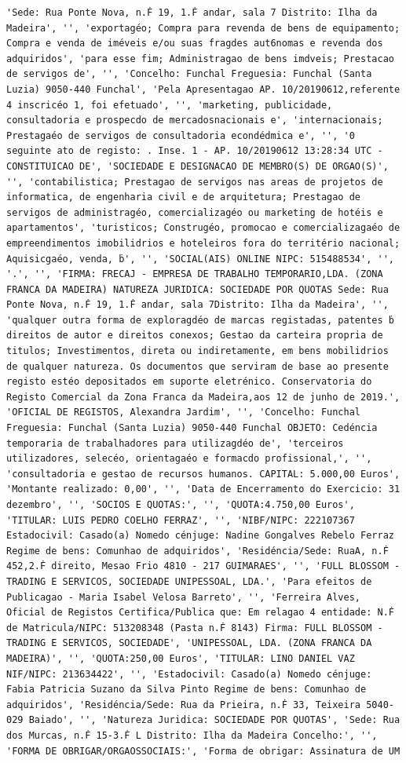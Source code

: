 \documentclass[
  12pt,
]{article}
\begin{document}
\begin{verbatim}
'Sede: Rua Ponte Nova, n.Ḟ 19, 1.Ḟ andar, sala 7 Distrito: Ilha da Madeira', '', 'exportagéo; Compra para revenda de bens de equipamento; Compra e venda de iméveis e/ou suas fragdes aut6nomas e revenda dos adquiridos', 'para esse fim; Administragao de bens imdveis; Prestacao de servigos de', '', 'Concelho: Funchal Freguesia: Funchal (Santa Luzia) 9050-440 Funchal', 'Pela Apresentagao AP. 10/20190612,referente 4 inscricéo 1, foi efetuado', '', 'marketing, publicidade, consultadoria e prospecdo de mercadosnacionais e', 'internacionais; Prestagaéo de servigos de consultadoria econdédmica e', '', '0 seguinte ato de registo: . Inse. 1 - AP. 10/20190612 13:28:34 UTC - CONSTITUICAO DE', 'SOCIEDADE E DESIGNACAO DE MEMBRO(S) DE ORGAO(S)', '', 'contabilistica; Prestagao de servigos nas areas de projetos de informatica, de engenharia civil e de arquitetura; Prestagao de servigos de administragéo, comercializagéo ou marketing de hotéis e apartamentos', 'turisticos; Construgéo, promocao e comercializagaéo de empreendimentos imobilidrios e hoteleiros fora do territério nacional; Aquisicgaéo, venda, ḃ', '', 'SOCIAL(AIS) ONLINE NIPC: 515488534', '', '.', '', 'FIRMA: FRECAJ - EMPRESA DE TRABALHO TEMPORARIO,LDA. (ZONA FRANCA DA MADEIRA) NATUREZA JURIDICA: SOCIEDADE POR QUOTAS Sede: Rua Ponte Nova, n.Ḟ 19, 1.Ḟ andar, sala 7Distrito: Ilha da Madeira', '', 'qualquer outra forma de exploragdéo de marcas registadas, patentes ḃ direitos de autor e direitos conexos; Gestao da carteira propria de titulos; Investimentos, direta ou indiretamente, em bens mobilidrios de qualquer natureza. Os documentos que serviram de base ao presente registo estéo depositados em suporte eletrénico. Conservatoria do Registo Comercial da Zona Franca da Madeira,aos 12 de junho de 2019.', 'OFICIAL DE REGISTOS, Alexandra Jardim', '', 'Concelho: Funchal Freguesia: Funchal (Santa Luzia) 9050-440 Funchal OBJETO: Cedéncia temporaria de trabalhadores para utilizagdéo de', 'terceiros utilizadores, selecéo, orientagaéo e formacdo profissional,', '', 'consultadoria e gestao de recursos humanos. CAPITAL: 5.000,00 Euros', 'Montante realizado: 0,00', '', 'Data de Encerramento do Exercicio: 31 dezembro', '', 'SOCIOS E QUOTAS:', '', 'QUOTA:4.750,00 Euros', 'TITULAR: LUIS PEDRO COELHO FERRAZ', '', 'NIBF/NIPC: 222107367 Estadocivil: Casado(a) Nomedo cénjuge: Nadine Gongalves Rebelo Ferraz Regime de bens: Comunhao de adquiridos', 'Residéncia/Sede: RuaA, n.Ḟ 452,2.Ḟ direito, Mesao Frio 4810 - 217 GUIMARAES', '', 'FULL BLOSSOM - TRADING E SERVICOS, SOCIEDADE UNIPESSOAL, LDA.', 'Para efeitos de Publicagao - Maria Isabel Velosa Barreto', '', 'Ferreira Alves, Oficial de Registos Certifica/Publica que: Em relagao 4 entidade: N.Ḟ de Matricula/NIPC: 513208348 (Pasta n.Ḟ 8143) Firma: FULL BLOSSOM - TRADING E SERVICOS, SOCIEDADE', 'UNIPESSOAL, LDA. (ZONA FRANCA DA MADEIRA)', '', 'QUOTA:250,00 Euros', 'TITULAR: LINO DANIEL VAZ NIF/NIPC: 213634422', '', 'Estadocivil: Casado(a) Nomedo cénjuge: Fabia Patricia Suzano da Silva Pinto Regime de bens: Comunhao de adquiridos', 'Residéncia/Sede: Rua da Prieira, n.Ḟ 33, Teixeira 5040-029 Baiado', '', 'Natureza Juridica: SOCIEDADE POR QUOTAS', 'Sede: Rua dos Murcas, n.Ḟ 15-3.Ḟ L Distrito: Ilha da Madeira Concelho:', '', 'FORMA DE OBRIGAR/ORGAOSSOCIAIS:', 'Forma de obrigar: Assinatura de UM 
\end{verbatim}
\end{document}
